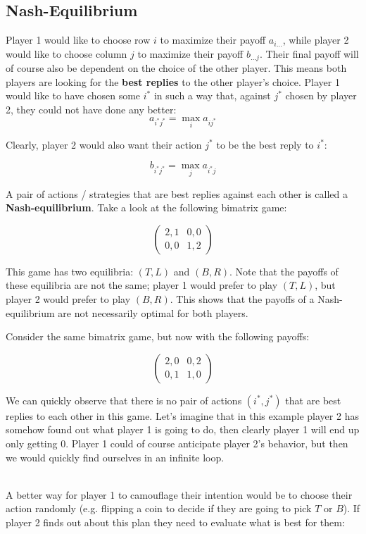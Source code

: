 \documentclass[12pt]{article}
\begin{document}
\subsection{Nash-Equilibrium}
Player 1 would like to choose row $i$ to maximize their payoff $a_{i\dots}$, while player 2 would like to choose column $j$ to maximize their payoff $b_{\dots j}$.
Their final payoff will of course also be dependent on the choice of the other player.
This means both players are looking for the \textbf{best replies} to the other player's choice.
Player 1 would like to have chosen some $i^*$ in such a way that, against $j^*$ chosen by player 2, they could not have done any better:
\[ a_{i^* j^*} = \max_i a_{ij^*} \]

\noindent
Clearly, player 2 would also want their action $j^*$ to be the best reply to $i^*$:

\[ b_{i^* j^*} = \max_j a_{i^*j} \]

\noindent
A pair of actions / strategies that are best replies against each other is called a \textbf{Nash-equilibrium}.
Take a look at the following bimatrix game:

\[ \begin{pmatrix}
    2,1 & 0,0 \\
    0,0 & 1,2
\end{pmatrix} \]

\noindent
This game has two equilibria: $(T, L)$ and $(B, R)$.
Note that the payoffs of these equilibria are not the same; player 1 would prefer to play $(T, L)$, but player 2 would prefer to play $(B, R)$.
This shows that the payoffs of a Nash-equilibrium are not necessarily optimal for both players.

\newpage
\noindent
Consider the same bimatrix game, but now with the following payoffs:

\[ \begin{pmatrix}
    2,0 & 0,2 \\
    0,1 & 1,0
\end{pmatrix} \]

\noindent
We can quickly observe that there is no pair of actions $(i^*, j^*)$ that are best replies to each other in this game.
Let's imagine that in this example player 2 has somehow found out what player 1 is going to do, then clearly player 1 will end up only getting 0.
Player 1 could of course anticipate player 2's behavior, but then we would quickly find ourselves in an infinite loop.

\noindent
\\
A better way for player 1 to camouflage their intention would be to choose their action randomly (e.g. flipping a coin to decide if they are going to pick $T$ or $B$).
If player 2 finds out about this plan they need to evaluate what is best for them:
\end{document}

